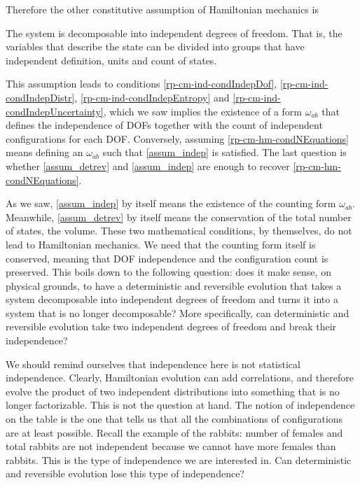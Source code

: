 Therefore the other constitutive assumption of Hamiltonian mechanics is
\renewcommand{\theassump}{IND}
\begin{assump}\label{assum_indep}
	The system is decomposable into independent degrees of freedom. That is, the variables that describe the state can be divided into groups that have independent definition, units and count of states.
\end{assump}
\renewcommand{\theassump}{\Roman{assump}}
This assumption leads to conditions \ref{rp-cm-ind-condIndepDof}, \ref{rp-cm-ind-condIndepDistr}, \ref{rp-cm-ind-condIndepEntropy} and
\ref{rp-cm-ind-condIndepUncertainty}, which we saw implies the existence of a form $\omega_{ab}$ that defines the independence of DOFs together with the count of independent configurations for each DOF. Conversely, assuming \ref{rp-cm-hm-condNEquations} means defining an $\omega_{ab}$ such that \ref{assum_indep} is satisfied. The last question is whether \ref{assum_detrev} and \ref{assum_indep} are enough to recover \ref{rp-cm-hm-condNEquations}.

As we saw, \ref{assum_indep} by itself means the existence of the counting form $\omega_{ab}$. Meanwhile, \ref{assum_detrev} by itself means the conservation of the total number of states, the volume. These two mathematical conditions, by themselves, do not lead to Hamiltonian mechanics. We need that the counting form itself is conserved, meaning that DOF independence and the configuration count is preserved. This boils down to the following question: does it make sense, on physical grounds, to have a deterministic and reversible evolution that takes a system decomposable into independent degrees of freedom and turns it into a system that is no longer decomposable? More specifically, can deterministic and reversible evolution take two independent degrees of freedom and break their independence?

We should remind ourselves that independence here is not statistical independence. Clearly, Hamiltonian evolution can add correlations, and therefore evolve the product of two independent distributions into something that is no longer factorizable. This is not the question at hand. The notion of independence on the table is the one that tells us that all the combinations of configurations are at least possible. Recall the example of the rabbits: number of females and total rabbits are not independent because we cannot have more females than rabbits. This is the type of independence we are interested in. Can deterministic and reversible evolution lose this type of independence?

